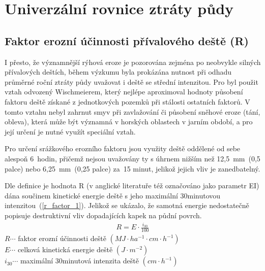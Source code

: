 \section{Univerzální rovnice ztráty půdy}
\subsection{Faktor erozní účinnosti přívalového deště (R)}
I přesto, že významnější rýhová eroze je pozorována zejména po
neobvykle silných přívalových deštích, během výzkumu byla prokázána
nutnost při odhadu průměrné roční ztráty půdy uvažovat i deště se
střední intenzitou. Pro  byl použit vztah odvozený
Wischmeierem\cite{Wischmeier1959}, který nejlépe aproximoval hodnoty
působení faktoru deště získané z jednotkových pozemků při stálosti
ostatních faktorů. V tomto vztahu nebyl zahrnut smyv při zavlažování
či působení sněhové eroze (tání, obleva), která může být významná v
horských oblastech v jarním období, a pro její určení je nutné využít
speciální vztah.

Pro určení srážkového erozního faktoru jsou využity deště oddělené od
sebe alespoň 6~hodin, přičemž nejsou uvažovány ty s úhrnem nižším než
12,5~mm~(0,5 palce) nebo 6,25~mm~(0,25 palce) za~15 minut, jelikož
jejich vliv je zanedbatelný.

Dle definice je hodnota R (v anglické literatuře též označováno jako
parametr EI) dána součinem kinetické energie deště s jeho maximální
30minutovou intenzitou~(\ref{r_factor_1}). Jelikož se ukázalo, že
samotná energie nedostatečně popisuje destruktivní vliv dopadajících
kapek na půdní povrch.\cite{usle1978}
\begin{align}
   \label{r_factor_1} R=E\cdot  \frac{i_{30}}{100}
\end{align}
\hspace*{2cm}$R \cdots$ faktor erozní účinnosti deště $\left( MJ\cdot
ha^{-1}\cdot cm \cdot h^{-1} \right)$\\
\hspace*{2cm}$E \cdots$ celková kinetická energie deště $\left( J\cdot
m^{-2} \right)$\\
\hspace*{2cm}$i_{30} \cdots$ maximální 30minutová intenzita deště
$\left( cm\cdot h^{-1} \right)$\\

